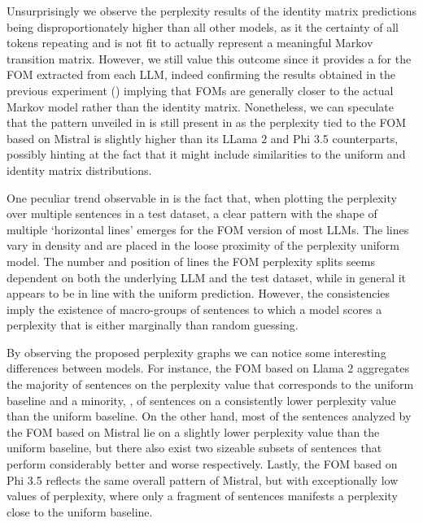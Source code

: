 Unsurprisingly we observe the perplexity results of the identity matrix predictions being disproportionately higher than all other models, as it  the certainty of all tokens repeating and is not fit to actually represent a meaningful Markov transition matrix.
However, we still value this outcome since it provides a  for the FOM extracted from each LLM, indeed confirming the results obtained in the previous experiment () implying that FOMs are generally closer to the actual Markov model rather than the identity matrix.
Nonetheless, we can speculate that the pattern unveiled in  is still present in  as the perplexity tied to the FOM based on Mistral is slightly higher than its LLama 2 and Phi 3.5 counterparts, possibly hinting at the fact that it might include similarities to the uniform and identity matrix distributions.


One peculiar trend observable in  is the fact that, when plotting the perplexity over multiple sentences in a test dataset, a clear pattern with the shape of multiple `horizontal lines' emerges for the FOM version of most LLMs.
The lines vary in density and are placed in the loose proximity of the perplexity  uniform model.
The number and position of lines  the FOM perplexity splits seems dependent on both the underlying LLM and the test dataset, while in general it appears to be in line with the uniform prediction.
However, the  consistencies imply the existence of macro-groups of sentences to which a model  scores a perplexity that is either marginally  than random guessing.

By observing the proposed perplexity graphs we can notice some interesting differences between models. 
For instance, the FOM based on Llama 2 aggregates the majority of sentences on the perplexity value that corresponds to the uniform baseline and a minority, , of sentences on a consistently lower perplexity value than the uniform baseline.
On the other hand, most of the sentences analyzed by the FOM based on Mistral lie on a slightly lower perplexity value than the uniform baseline, but there also exist two sizeable subsets of sentences that perform considerably better and worse respectively.
Lastly, the FOM based on Phi 3.5 reflects the same overall pattern of Mistral, but with exceptionally low values of perplexity, where only a fragment of sentences manifests a perplexity close to the uniform baseline.

